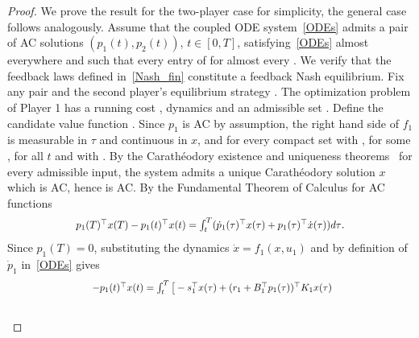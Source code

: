 \documentclass[letterpaper, 10 pt, conference]{ieeeconf}
\theoremstyle{definition}
\begin{document}
\begin{proof}
We prove the result for the two-player case for simplicity, the general case follows analogously. Assume that the coupled ODE system~\eqref{ODEs} admits a pair of AC solutions $(p_1(t), p_2(t))$, $t\in [0,T]$, satisfying~\eqref{ODEs} almost everywhere and such that every entry of  for almost every . We verify that the feedback laws defined in~\eqref{Nash_fin} constitute a feedback Nash equilibrium. Fix any pair  and the second player's equilibrium strategy . The optimization problem of Player 1 has a running cost , dynamics  and an admissible set .  Define the candidate value function . Since $p_1$ is AC by assumption, the right hand side of $f_1$ is measurable in $\tau$ and continuous in $x$, and for every compact set   with , for some ,  for all $t$ and  with . By the Carathéodory existence and uniqueness theorems~\cite[Thm. 5.1, Thm. 5.3]{caratheodory} for every admissible input, the system  admits a unique Carathéodory solution $x$ which is AC, hence  is AC. 
By the Fundamental Theorem of Calculus for AC functions~\cite[Thm. 7.18]{Rudin} 
\begin{align*}
    \scalebox{.9}{$p_1(T)^{\top}x(T)-p_1(t)^{\top}x(t)=\int_t^T (\dot p_1(\tau)^{\top}x(\tau)+p_1(\tau)^{\top}\dot x(\tau))d \tau$}.
\end{align*}
Since $p_1(T)=0$, substituting the dynamics $\dot x=f_1(x, u_1)$ and by definition of $\dot p_1$ in~\eqref{ODEs} gives
\begin{align*}
    &\scalebox{.87}{$-p_1(t)^{\top}x(t)=\int_{t}^T\big[-s_1^{\top}x(\tau)+(r_1+B_1^{\top}p_1(\tau))^{\top}K_1x(\tau)$}\\\

\end{align*}
\end{proof}
\end{document}
